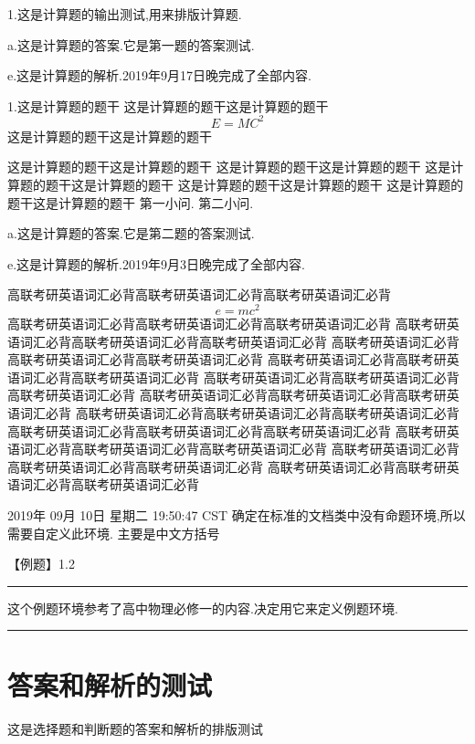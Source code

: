 \documentclass[a4paper,fontset = windows]{ctexbook}
\begin{document}
\begin{calculations}
  1.这是计算题的输出测试,用来排版计算题.

  a.这是计算题的答案.它是第一题的答案测试.

e.这是计算题的解析.2019年9月17日晚完成了全部内容.

1.这是计算题的题干
这是计算题的题干这是计算题的题干
\[  E=MC^2 \]
这是计算题的题干这是计算题的题干
这是计算题的题干这是计算题的题干
这是计算题的题干这是计算题的题干
这是计算题的题干这是计算题的题干
这是计算题的题干这是计算题的题干
这是计算题的题干这是计算题的题干
\qitem 第一小问.
\qitem 第二小问.

  a.这是计算题的答案.它是第二题的答案测试.

e.这是计算题的解析.2019年9月3日晚完成了全部内容.

\end{calculations}

%
高联考研英语词汇必背高联考研英语词汇必背高联考研英语词汇必背
\[e=mc^2\]
高联考研英语词汇必背高联考研英语词汇必背高联考研英语词汇必背
高联考研英语词汇必背高联考研英语词汇必背高联考研英语词汇必背
高联考研英语词汇必背高联考研英语词汇必背高联考研英语词汇必背
高联考研英语词汇必背高联考研英语词汇必背高联考研英语词汇必背
高联考研英语词汇必背高联考研英语词汇必背高联考研英语词汇必背
高联考研英语词汇必背高联考研英语词汇必背高联考研英语词汇必背
高联考研英语词汇必背高联考研英语词汇必背高联考研英语词汇必背
高联考研英语词汇必背高联考研英语词汇必背高联考研英语词汇必背
高联考研英语词汇必背高联考研英语词汇必背高联考研英语词汇必背
高联考研英语词汇必背高联考研英语词汇必背高联考研英语词汇必背
高联考研英语词汇必背高联考研英语词汇必背高联考研英语词汇必背



2019年 09月 10日 星期二 19:50:47 CST
确定在标准的文档类中没有命题环境,所以需要自定义此环境.
主要是中文方括号

\parindent=0pt
【{\heiti 例题}】1.2
\vspace{2pt}
\hrule
\vspace{10pt}

\ccwd
 这个例题环境参考了高中物理必修一的内容.决定用它来定义例题环境.

\vspace{10pt}
\hrule

\newpage
\section{答案和解析的测试}

这是选择题和判断题的答案和解析的排版测试

\makeanswer
\end{document}
